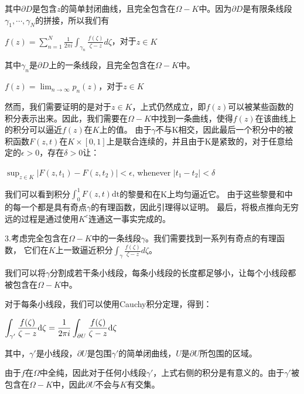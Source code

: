 \documentclass[12pt, a4paper, oneside]{article}
\begin{document}
\begin{spacing}{2.0}
其中$\partial D$是包含$z$的简单封闭曲线，且完全包含在$\Omega - K$中。因为$\partial D$是有限条线段$\gamma_1,\cdots,\gamma_N$的拼接，所以我们有

\begin{center}
$f(z) = \displaystyle\sum_{n = 1}^{N}\frac{1}{2\pi i}\int_{\gamma_n}\frac{f(\zeta)}{\zeta - z}d\zeta$，对于$z\in K$
\end{center}

其中$\gamma_n$是$\partial D$上的一条线段，且完全包含在$\Omega - K$中。
\begin{center}
$\displaystyle f(z) = \lim_{n \to \infty}p_n(z)$，对于$z\in K$
\end{center}

然而，我们需要证明的是对于$z\in K$，上式仍然成立，即$f(z)$可以被某些函数的积分表示出来。因此，我们需要在$\Omega-K$中找到一条曲线，使得$f(z)$在该曲线上的积分可以逼近$f(z)$在$K$上的值。
由于$\gamma$不与K相交，因此最后一个积分中的被积函数$F(z,t)$在$K\times[0,1]$上是联合连续的，并且由于K是紧致的，对于任意给定的$\epsilon>0$，存在$\delta>0$让：\cite{fornaess2020holomorphic}
\begin{center}
    $\displaystyle\sup_{z\in K}|F(z, t_1)-F(z, t_2)|<\epsilon$, whenever $|t_1-t_2|<\delta$
\end{center}

我们可以看到积分$\displaystyle\int_0^1 F(z, t) \mathrm{dt}$的黎曼和在K上均匀逼近它。
由于这些黎曼和中的每一个都是具有奇点$\gamma$的有理函数，因此引理得以证明。
最后，将极点推向无穷远的过程是通过使用$K^c$连通这一事实完成的。

3.考虑完全包含在$\Omega-K$中的一条线段$\gamma$。我们需要找到一系列有奇点的有理函数，
它们在$K$上一致逼近积分$\displaystyle\int_{\gamma}\frac{f(\zeta)}{\zeta-z}d\zeta$。

我们可以将$\gamma$分割成若干条小线段，每条小线段的长度都足够小，让每个小线段都被包含在$\Omega-K$中。

对于每条小线段，我们可以使用Cauchy积分定理，得到：
\begin{center}
    $\displaystyle \displaystyle\int_{\gamma'}\frac{f(\zeta)}{\zeta-z}\mathrm{d\zeta} = \frac{1}{2\pi i} \displaystyle\int_{\partial U}\frac{f(\zeta)}{\zeta - z}\mathrm{d\zeta}$
\end{center}
其中，$\gamma'$是小线段，$\partial U$是包围$\gamma'$的简单闭曲线，$U$是$\partial U$所包围的区域。

由于$f$在$\Omega$中全纯，因此对于任何小线段$\gamma'$，上式右侧的积分是有意义的。由于$\gamma'$被包含在$\Omega-K$中，因此$\partial U$不会与$K$有交集。


\end{spacing}
\end{document}
